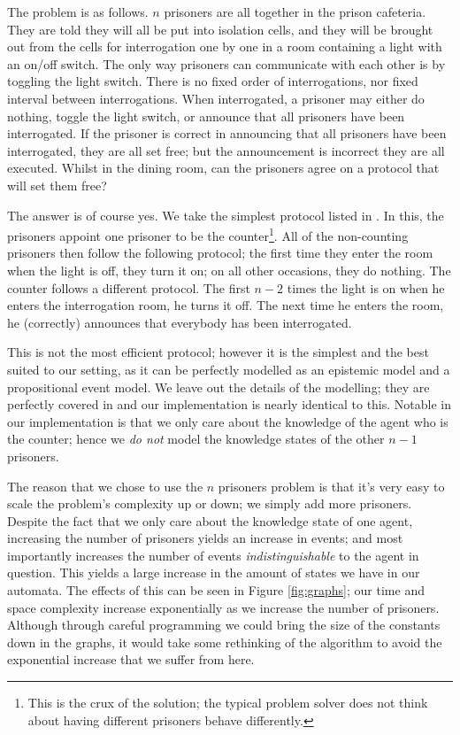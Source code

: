 \documentclass[10pt, a4paper]{report}
\begin{document}
The problem is as follows. $n$ prisoners are all together in the prison
cafeteria. They are told they will all be put into isolation cells, and they
will be brought out from the cells for interrogation one by one in a room
containing a light with an on/off switch. The only way prisoners can communicate
with each other is by toggling the light switch. There is no fixed order of
interrogations, nor fixed interval between interrogations. When interrogated, a
prisoner may either do nothing, toggle the light switch, or announce that all
prisoners have been interrogated. If the prisoner is correct in announcing that
all prisoners have been interrogated, they are all set free; but the
announcement is incorrect they are all executed. Whilst in the dining room, can
the prisoners agree on a protocol that will set them free? 

The answer is of course yes. We take the simplest protocol listed in
\cite{Prisoners}. In this, the prisoners appoint one prisoner to be the
counter\footnote{This is the crux of the solution; the typical problem solver
  does not think about having different prisoners behave differently.}. All of
the non-counting prisoners then follow the following protocol; the first time
they enter the room when the light is off, they turn it on; on all other
occasions, they do nothing. The counter follows a different protocol. The first
$n - 2$ times the light is on when he enters the interrogation room, he turns it
off. The next time he enters the room, he (correctly) announces that everybody
has been interrogated.

This is not the most efficient protocol; however it is the simplest and the best
suited to our setting, as it can be perfectly modelled as an epistemic model and
a propositional event model. We leave out the details of the modelling; they are
perfectly covered in \cite{Prisoners} and our implementation is nearly identical
to this. Notable in our implementation is that we only care about the knowledge
of the agent who is the counter; hence we \emph{do not} model the knowledge
states of the other $n - 1$ prisoners. 

The reason that we chose to use the $n$ prisoners problem is that it's very easy
to scale the problem's complexity up or down; we simply add more prisoners.
Despite the fact that we only care about the knowledge state of one agent,
increasing the number of prisoners yields an increase in events; and most
importantly increases the number of events \emph{indistinguishable} to the agent
in question. This yields a large increase in the amount of states we have in our
automata. The effects of this can be seen in Figure \ref{fig:graphs}; our time
and space complexity increase exponentially as we increase the number of
prisoners. Although through careful programming we could bring the size of the
constants down in the graphs, it would take some rethinking of the algorithm to
avoid the exponential increase that we suffer from here.
\end{document}
